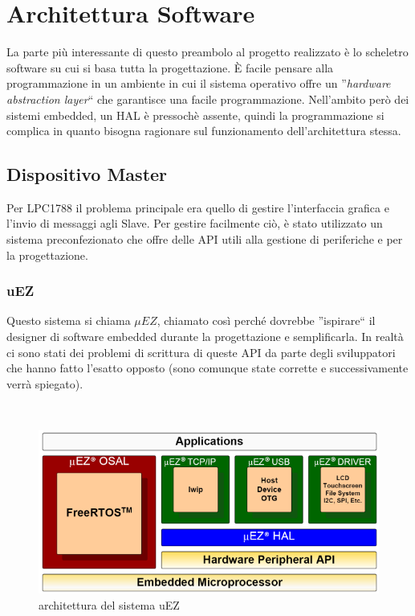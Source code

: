 \documentclass[a4paper,titlepage]{book}
\begin{document}


\chapter{Architettura Software}

La parte più interessante di questo preambolo al progetto realizzato è lo scheletro software su cui si basa tutta la progettazione. È facile pensare alla programmazione in un ambiente in cui il sistema operativo offre un ''\textit{hardware abstraction layer}`` che garantisce una facile programmazione. Nell'ambito però dei sistemi embedded, un HAL è pressochè assente, quindi la programmazione si complica in quanto bisogna ragionare sul funzionamento dell'architettura stessa.


\section{Dispositivo Master}

Per LPC1788 il problema principale era quello di gestire l'interfaccia grafica e l'invio di messaggi agli Slave. Per gestire facilmente ciò, è stato utilizzato un sistema preconfezionato che offre delle API utili alla gestione di periferiche e per la progettazione. 


\subsection{uEZ}
Questo sistema si chiama $\mu EZ$, chiamato così perché dovrebbe ''ispirare`` il designer di software embedded durante la progettazione e semplificarla. In realtà ci sono stati dei problemi di scrittura di queste API da parte degli sviluppatori che hanno fatto l'esatto opposto (sono comunque state corrette e successivamente verrà spiegato).

~

\begin{figure}[!h]
\centering
\includegraphics[scale=0.7]{uEZ.png}
\caption{architettura del sistema uEZ}\label{fig:1}
\end{figure}
\end{document}
